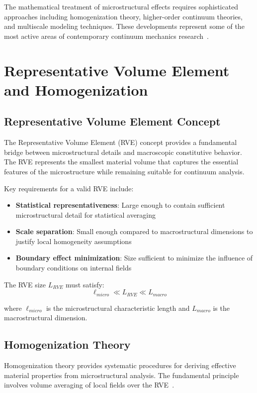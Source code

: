 The mathematical treatment of microstructural effects requires sophisticated approaches including homogenization theory, higher-order continuum theories, and multiscale modeling techniques. These developments represent some of the most active areas of contemporary continuum mechanics research~\autocite{Sadd.2019}.

\section{Representative Volume Element and Homogenization}

\subsection{Representative Volume Element Concept}

The Representative Volume Element (RVE) concept provides a fundamental bridge between microstructural details and macroscopic constitutive behavior. The RVE represents the smallest material volume that captures the essential features of the microstructure while remaining suitable for continuum analysis.

Key requirements for a valid RVE include:
\begin{itemize}
\item \textbf{Statistical representativeness}: Large enough to contain sufficient microstructural detail for statistical averaging
\item \textbf{Scale separation}: Small enough compared to macrostructural dimensions to justify local homogeneity assumptions
\item \textbf{Boundary effect minimization}: Size sufficient to minimize the influence of boundary conditions on internal fields
\end{itemize}

The RVE size $L_{RVE}$ must satisfy:
\begin{equation}
\ell_{micro} \ll L_{RVE} \ll L_{macro}
\end{equation}

where $\ell_{micro}$ is the microstructural characteristic length and $L_{macro}$ is the macrostructural dimension.

\subsection{Homogenization Theory}

Homogenization theory provides systematic procedures for deriving effective material properties from microstructural analysis. The fundamental principle involves volume averaging of local fields over the RVE~\autocite{Sadd.2019}.

